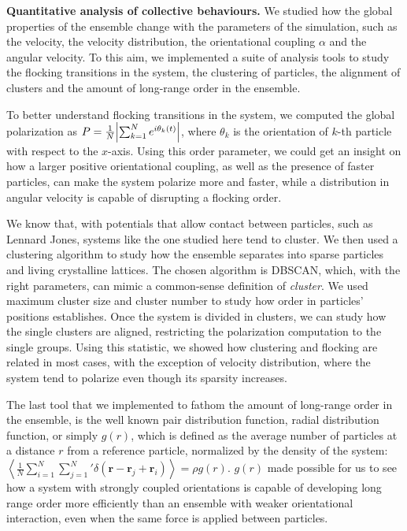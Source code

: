 \documentclass[a4paper, notitlepage]{report} %
\begin{document}
	\textbf{Quantitative analysis of collective behaviours.}
	We studied how the global properties of the ensemble change with the parameters of the simulation, such as the velocity, the velocity distribution, the orientational coupling $\alpha$ and the angular velocity.
	To this aim, we implemented a suite of analysis tools to study the flocking transitions in the system, the clustering of particles, the alignment of clusters and the amount of long-range order in the ensemble.

	To better understand flocking transitions in the system, we computed the global polarization as $P = \frac{1}{N} \abs{\sum_{k=1}^{N} e^{i \theta_k(t)}}$, where $\theta_k$ is the orientation of $k$-th particle with respect to the $x$-axis.
	Using this order parameter, we could get an insight on how a larger positive orientational coupling, as well as the presence of faster particles, can make the system polarize more and faster, while a distribution in angular velocity is capable of disrupting a flocking order. %

	We know that, with potentials that allow contact between particles, such as Lennard Jones, systems like the one studied here tend to cluster.
	We then used a clustering algorithm to study how the ensemble separates into sparse particles and living crystalline lattices.
	The chosen algorithm is DBSCAN, which, with the right parameters, can mimic a common-sense definition of \emph{cluster}.
	We used maximum cluster size and cluster number to study how order in particles' positions establishes.
	Once the system is divided in clusters, we can study how the single clusters are aligned, restricting the polarization computation to the single groups.
	Using this statistic, we showed how clustering and flocking are related in most cases, with the exception of velocity distribution, where the system tend to polarize even though its sparsity increases.

	The last tool that we implemented to fathom the amount of long-range order in the ensemble, is the well known pair distribution function, radial distribution function, or simply $g(r)$, which is defined \cite{hansen90a} as the average number of particles at a distance $r$ from a reference particle, normalized by the density of the system:
	$\left\langle \frac{1}{N} \sum_{i=1}^{N} \sum_{j=1}^{N}{}' \delta (\mathbf{r} - \mathbf{r}_j + \mathbf{r}_i) \right\rangle = \rho g(r)$.
	$g(r)$ made possible for us to see how a system with strongly coupled orientations is capable of developing long range order more efficiently than an ensemble with weaker orientational interaction, even when the same force is applied between particles. 
	
\end{document}
